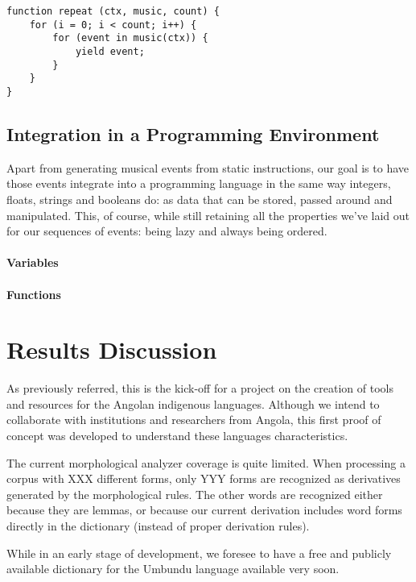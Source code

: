 \documentclass[a4paper,UKenglish,cleveref, autoref]{oasics-v2019}
\begin{document}
\begin{lstlisting}[caption={Algorithm for repetition},label=list:8-6,captionpos=t,abovecaptionskip=-\medskipamount]
function repeat (ctx, music, count) {
    for (i = 0; i < count; i++) {
        for (event in music(ctx)) {
            yield event;
        }
    }
}
\end{lstlisting}

\subsection{Integration in a Programming Environment}
Apart from generating musical events from static instructions, our goal is to have those events integrate into a programming language in the same way integers, floats, strings and booleans do: as data that can be stored, passed around and manipulated. This, of course, while still retaining all the properties we've laid out for our sequences of events: being lazy and always being ordered.

\paragraph*{Variables}


\paragraph*{Functions}

\section{Results Discussion}
\label{sec:conclusions}

As previously referred, this is the kick-off for a project on the
creation of tools and resources for the Angolan indigenous
languages. Although we intend to collaborate with institutions and
researchers from Angola, this first proof of concept was developed to
understand these languages characteristics.

The current morphological analyzer coverage is quite limited. When
processing a corpus with XXX different forms, only YYY   forms are
recognized as derivatives generated by the morphological rules. The
other words are recognized either because they are lemmas, or because
our current derivation includes word forms directly in the dictionary
(instead of proper derivation rules).

While in an early stage of development, we foresee to have a free and
publicly available dictionary for the Umbundu language available very
soon.



\end{document}
